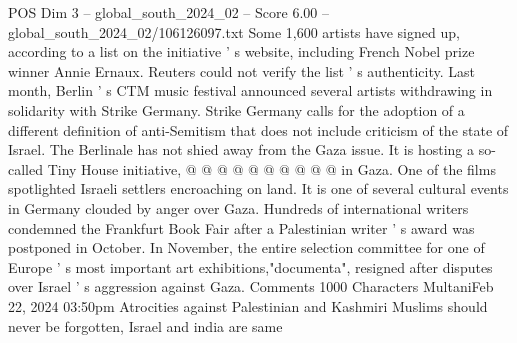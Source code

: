 \begin{textsample}{POS Dim 3 – global\_south\_2024\_02 – Score 6.00 – global\_south\_2024\_02/106126097.txt}
Some 1,600 artists have signed up, according to a list on the initiative ' s website, including French Nobel prize winner Annie Ernaux.
Reuters could not verify the list ' s authenticity.
Last month, Berlin ' s CTM music festival announced several artists withdrawing in solidarity with Strike Germany.
Strike Germany calls for the adoption of a different definition of anti-Semitism that does not include criticism of the state of Israel.
The Berlinale has not shied away from the Gaza issue.
It is hosting a so-called Tiny House initiative, @ @ @ @ @ @ @ @ @ @ in Gaza.
One of the films spotlighted Israeli settlers encroaching on land.
It is one of several cultural events in Germany clouded by anger over Gaza.
Hundreds of international writers condemned the Frankfurt Book Fair after a Palestinian writer ' s award was postponed in October.
In November, the entire selection committee for one of Europe ' s most important art exhibitions,"documenta", resigned after disputes over Israel ' s aggression against Gaza.
Comments 1000 Characters MultaniFeb 22, 2024 03:50pm Atrocities against Palestinian and Kashmiri Muslims should never be forgotten, Israel and india are same

\end{textsample}
